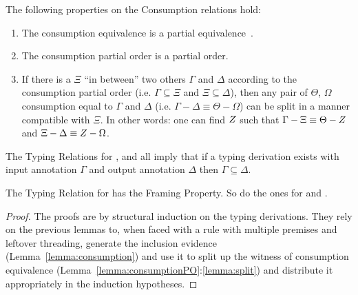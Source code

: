 \begin{lemma} The following properties on the Consumption relations hold:\label{lemma:consumptionPO}
\begin{enumerate}
  \item The consumption equivalence is a partial equivalence~\cite{mitchell1996foundations}.
  \item The consumption partial order is a partial order.
  \item If there is a \Usages{} \ensuremath{\Xi} ``in between'' two others \ensuremath{\Gamma} and \ensuremath{\Delta} according to
        the consumption partial order (i.e. \ensuremath{\Gamma \subseteq \Xi} and \ensuremath{\Xi \subseteq \Delta}), then any pair
        of \Usages{} \ensuremath{\Theta}, \ensuremath{\Omega} consumption equal to \ensuremath{\Gamma} and \ensuremath{\Delta}
        (i.e. \mbox{\ensuremath{\Gamma - \Delta \equiv \Theta - \Omega}})
        can be split in a manner compatible with \ensuremath{\Xi}. In other words: one can find
        \ensuremath{\Zeta} such that \mbox{\ensuremath{\Gamma - \Xi \equiv \Theta - \Zeta}}
        and \mbox{\ensuremath{\Xi - \Delta \equiv \Zeta -\Omega}}.\label{lemma:split}
\end{enumerate}
\end{lemma}

\begin{lemma}[Consumption]The Typing Relations for \Var{}, \Inferable{}
and \Checkable{} all imply that if a typing derivation exists with input
\Usages{} annotation \ensuremath{\Gamma} and output \Usages{} annotation \ensuremath{\Delta}
then \ensuremath{\Gamma \subseteq \Delta}.\label{lemma:consumption}
\end{lemma}

\begin{theorem}
\label{theorem:framing}
The Typing Relation for \Var{} has the Framing Property.
So do the ones for \Inferable{} and \Checkable{}.
\end{theorem}
\begin{proof}
The proofs are by structural induction on the typing derivations. They rely on
the previous lemmas to, when faced with a rule with multiple premises and leftover
threading, generate the inclusion evidence (Lemma~\ref{lemma:consumption}) and use it to split up the witness
of consumption equivalence (Lemma~\ref{lemma:consumptionPO}:\ref{lemma:split}) and distribute it appropriately in the induction hypotheses.
\end{proof}


